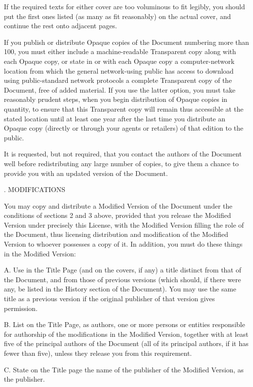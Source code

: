 If the required texts for either cover are too voluminous to fit legibly, you should put the first ones listed (as many as fit reasonably) on the actual cover, and continue the rest onto adjacent pages.

If you publish or distribute Opaque copies of the Document numbering more than 100, you must either include a machine-readable Transparent copy along with each Opaque copy, or state in or with each Opaque copy a computer-network location from which the general network-using public has access to download using public-standard network protocols a complete Transparent copy of the Document, free of added material. If you use the latter option, you must take reasonably prudent steps, when you begin distribution of Opaque copies in quantity, to ensure that this Transparent copy will remain thus accessible at the stated location until at least one year after the last time you distribute an Opaque copy (directly or through your agents or retailers) of that edition to the public.

It is requested, but not required, that you contact the authors of the Document well before redistributing any large number of copies, to give them a chance to provide you with an updated version of the Document.

. MODIFICATIONS

You may copy and distribute a Modified Version of the Document under the conditions of sections 2 and 3 above, provided that you release the Modified Version under precisely this License, with the Modified Version filling the role of the Document, thus licensing distribution and modification of the Modified Version to whoever possesses a copy of it. In addition, you must do these things in the Modified Version:

A. Use in the Title Page (and on the covers, if any) a title distinct from that of the Document, and from those of previous versions (which should, if there were any, be listed in the History section of the Document). You may use the same title as a previous version if the original publisher of that version gives permission. 

B. List on the Title Page, as authors, one or more persons or entities responsible for authorship of the modifications in the Modified Version, together with at least five of the principal authors of the Document (all of its principal authors, if it has fewer than five), unless they release you from this requirement. 

C. State on the Title page the name of the publisher of the Modified Version, as the publisher. 

